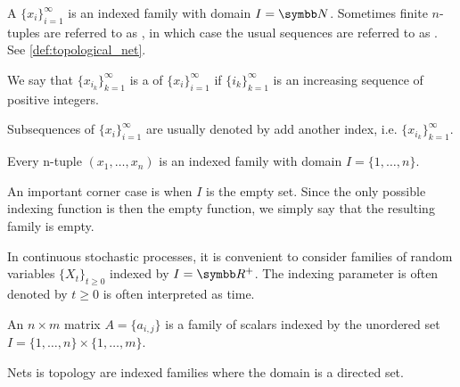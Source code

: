 \begin{definition}\label{def:sequence}
  A  $\{ x_i \}_{i=1}^\infty$ is an indexed family with domain $I = \BB N$. Sometimes finite $n$-tuples are referred to as , in which case the usual sequences are referred to as . See \cref{def:topological_net}.

  We say that $\{ x_{i_k} \}_{k=1}^\infty$ is a  of $\{ x_i \}_{i=1}^\infty$ if $\{ i_k \}_{k=1}^\infty$ is an increasing sequence of positive integers.

  Subsequences of $\{ x_i \}_{i=1}^\infty$ are usually denoted by add another index, i.e. $\{ x_{i_k} \}_{k=1}^\infty$.
\end{definition}

\begin{example}\label{ex:indexed_families}
  \mbox{}
  \begin{defenum}
    \item Every n-tuple $(x_1, \ldots, x_n)$ is an indexed family with domain $I = \{ 1, \ldots, n \}$.

    \item An important corner case is when $I$ is the empty set. Since the only possible indexing function is then the empty function, we simply say that the resulting family is empty.

    \item In continuous stochastic processes, it is convenient to consider families of random variables $\{ X_t \}_{t \geq 0}$ indexed by $I = \BB R^+$. The indexing parameter is often denoted by $t \geq 0$ is often interpreted as time.

    \item An $n \times m$ matrix $A = \{ a_{i,j} \}$ is a family of scalars indexed by the unordered set $I = \{ 1, \ldots, n \} \times \{ 1, \ldots, m \}$.

    \item Nets is topology are indexed families where the domain is a directed set.
  \end{defenum}
\end{example}
